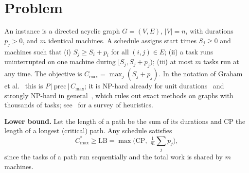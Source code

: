\documentclass[10pt,twocolumn]{article}
\begin{document}
\maketitle

\begin{abstract}
\noindent We study the minimisation of the makespan of a set of tasks with precedence constraints on $m$ identical machines without preemption, $P\,|\,\mathrm{prec}\,|\,C_{\max}$. The problem is strongly NP-hard, so we consider list scheduling, for which Graham's bound guarantees a ratio $2-1/m$ whatever the priority rule. We define the classical priorities (height, depth, t-level, b-level, number of successors, duration), a fuzzy tie-breaking rule, and a genetic algorithm that searches over convex combinations of these priorities. On 180 random graphs of 1000 tasks, the b-level rule shortens the makespan by $2.43\%$ on average relative to the height rule (standard error $0.30$); the fuzzy tie-break and the genetic algorithm give no significant further gain.
\end{abstract}

\section{Problem}
An instance is a directed acyclic graph $G=(V,E)$, $|V|=n$, with durations $p_j>0$, and $m$ identical machines. A schedule assigns start times $S_j\ge0$ and machines such that (i) $S_j\ge S_i+p_i$ for all $(i,j)\in E$; (ii) a task runs uninterrupted on one machine during $[S_j,S_j+p_j)$; (iii) at most $m$ tasks run at any time. The objective is $C_{\max}=\max_j(S_j+p_j)$. In the notation of Graham et al.~\cite{graham1979} this is $P\,|\,\mathrm{prec}\,|\,C_{\max}$; it is NP-hard already for unit durations~\cite{ullman1975} and strongly NP-hard in general~\cite{lenstra1978}, which rules out exact methods on graphs with thousands of tasks; see~\cite{kwok1999} for a survey of heuristics.

\textbf{Lower bound.} Let the length of a path be the sum of its durations and $\mathrm{CP}$ the length of a longest (critical) path. Any schedule satisfies
\begin{equation}\label{eq:lb}
C^*_{\max}\ge\mathrm{LB}=\max\Big(\mathrm{CP},\;\tfrac1m\textstyle\sum_jp_j\Big),
\end{equation}
since the tasks of a path run sequentially and the total work is shared by $m$ machines.
\end{document}
